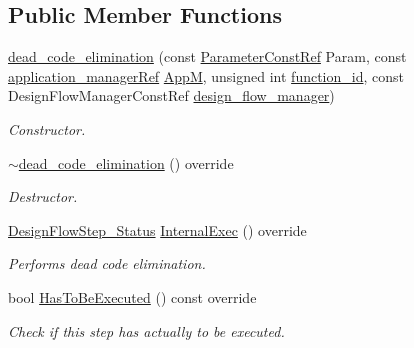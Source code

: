 \subsection*{Public Member Functions}
\begin{DoxyCompactItemize}
\item 
\hyperlink{classdead__code__elimination_a75171b8c1c163c7ded6e51d528d314d6}{dead\+\_\+code\+\_\+elimination} (const \hyperlink{Parameter_8hpp_a37841774a6fcb479b597fdf8955eb4ea}{Parameter\+Const\+Ref} Param, const \hyperlink{application__manager_8hpp_a04ccad4e5ee401e8934306672082c180}{application\+\_\+manager\+Ref} \hyperlink{classFrontendFlowStep_a0ac0d8db2a378416583f51c4faa59d15}{AppM}, unsigned int \hyperlink{classFunctionFrontendFlowStep_a58ef2383ad1a212a8d3f396625a4b616}{function\+\_\+id}, const Design\+Flow\+Manager\+Const\+Ref \hyperlink{classDesignFlowStep_ab770677ddf087613add30024e16a5554}{design\+\_\+flow\+\_\+manager})
\begin{DoxyCompactList}\small\item\em Constructor. \end{DoxyCompactList}\item 
\hyperlink{classdead__code__elimination_a64de8aa43bbf0badd72b23697a90c16d}{$\sim$dead\+\_\+code\+\_\+elimination} () override
\begin{DoxyCompactList}\small\item\em Destructor. \end{DoxyCompactList}\item 
\hyperlink{design__flow__step_8hpp_afb1f0d73069c26076b8d31dbc8ebecdf}{Design\+Flow\+Step\+\_\+\+Status} \hyperlink{classdead__code__elimination_a49b1c6bb467f000a41973440b21180ac}{Internal\+Exec} () override
\begin{DoxyCompactList}\small\item\em Performs dead code elimination. \end{DoxyCompactList}\item 
bool \hyperlink{classdead__code__elimination_aa7771fdf8a82f2e274bf0cfe44edf553}{Has\+To\+Be\+Executed} () const override
\begin{DoxyCompactList}\small\item\em Check if this step has actually to be executed. \end{DoxyCompactList}\end{DoxyCompactItemize}
